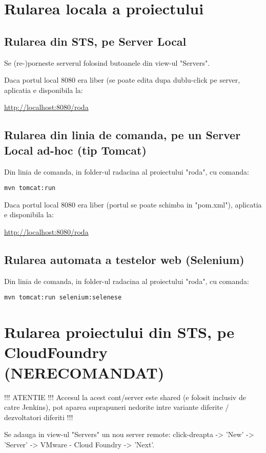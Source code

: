\section{Rularea locala a proiectului}

\subsection{Rularea din STS, pe Server Local}
Se (re-)porneste serverul folosind butoanele din view-ul "Servers".

Daca portul local 8080 era liber (se poate edita dupa dublu-click pe server,
aplicatia e disponibila la:

\url{http://localhost:8080/roda}

\subsection{Rularea din linia de comanda, pe un Server Local ad-hoc (tip
Tomcat)}
Din linia de comanda, in folder-ul radacina al proiectului "roda", cu comanda:
\begin{lstlisting}
mvn tomcat:run
\end{lstlisting}
Daca portul local 8080 era liber (portul se poate schimba in "pom.xml"),
aplicatia e disponibila la:

\url{http://localhost:8080/roda}

\subsection{Rularea automata a testelor web (Selenium)}
Din linia de comanda, in folder-ul radacina al proiectului "roda", cu comanda:
\begin{lstlisting}
mvn tomcat:run selenium:selenese
\end{lstlisting}

\section{Rularea proiectului din STS, pe CloudFoundry (NERECOMANDAT)}

!!! ATENTIE !!!
Accesul la acest cont/server este shared (e folosit inclusiv de catre Jenkins), 
pot aparea suprapuneri nedorite intre variante diferite / dezvoltatori diferiti !!!

Se adauga in view-ul "Servers" un nou server remote: click-dreapta -> 'New'
-> 'Server' -> VMware - Cloud Foundry -> 'Next'.

